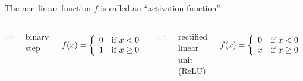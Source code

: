 \documentclass[aspectratio=169]{beamer}
\begin{document}
\begin{frame}{The non-linear function $f$ is called an ``activation function''}
\small
\vspace{0.5cm}
\begin{columns}
\includegraphics[width=\linewidth]{img/Activation_binary_step.pdf}

binary step

\vspace{-\baselineskip}
\[ f(x) = \left\{ \begin{array}{c l}
0 & \text{if } x < 0 \\
1 & \text{if } x \ge 0 \\
\end{array} \right. \]

\includegraphics[width=\linewidth]{img/Activation_rectified_linear.pdf}

rectified linear unit (ReLU)

\vspace{-\baselineskip}
\[ f(x) = \left\{ \begin{array}{c l}
0 & \text{if } x < 0 \\
x & \text{if } x \ge 0 \\
\end{array} \right. \]
\end{columns}


\end{frame}
\end{document}
